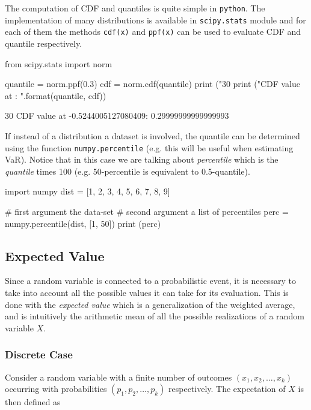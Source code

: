 The computation of CDF and quantiles is quite simple in \texttt{python}. The implementation of many distributions is available in \texttt{scipy.stats} module and for each of them the methods \texttt{cdf(x)} and \texttt{ppf(x)} can be used to evaluate CDF and quantile respectively.

\begin{ipython}
from scipy.stats import norm

quantile = norm.ppf(0.3)
cdf = norm.cdf(quantile)
print ("30%
print ("CDF value at {}: {}".format(quantile, cdf))
\end{ipython}
\begin{ioutput}
30%
CDF value at -0.5244005127080409: 0.29999999999999993
\end{ioutput}

If instead of a distribution a dataset is involved, the quantile can be determined using the function \texttt{numpy.percentile} (e.g. this will be useful when estimating VaR). Notice that in this case we are talking about \emph{percentile} which is the \emph{quantile} times 100 (e.g. 50-percentile is equivalent to 0.5-quantile).

\begin{ipython}
import numpy
dist = [1, 2, 3, 4, 5, 6, 7, 8, 9]

# first argument the data-set
# second argument a list of percentiles
perc = numpy.percentile(dist, [1, 50])
print (perc)
\end{ipython}
\begin{ioutput}
[1.08 5.  ]
\end{ioutput}

\subsection{Expected Value}\label{sec:expected-value}

Since a random variable is connected to a probabilistic event, it is necessary to take into account all the possible values it can take for its evaluation. This is done with the \emph{expected value}
which is a generalization of the weighted average, and is intuitively the arithmetic mean of all the possible realizations of a random variable \(X\).

\subsubsection{Discrete Case}
Consider a random variable with a finite number of outcomes $(x_{1},x_{2},\ldots ,x_{k})$ occurring with probabilities $(p_{1},p_{2},\ldots ,p_{k})$ respectively. The expectation of $X$ is then defined as

